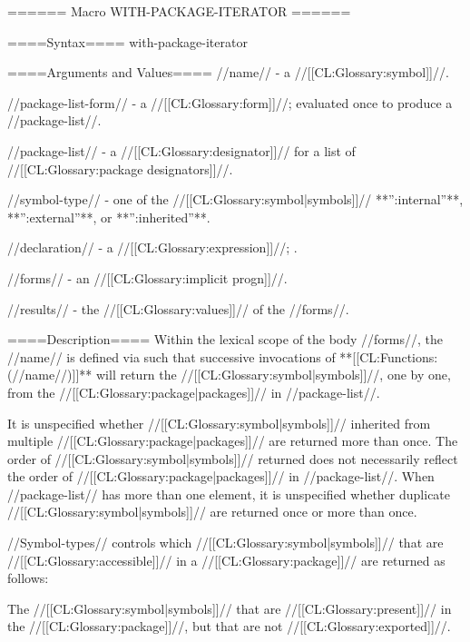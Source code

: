 ====== Macro WITH-PACKAGE-ITERATOR ======

====Syntax====
\DefmacWithValuesNewline with-package-iterator {  } {}

====Arguments and Values====
//name// - a //[[CL:Glossary:symbol]]//.

//package-list-form// - a //[[CL:Glossary:form]]//; evaluated once to produce a //package-list//.

//package-list// - a //[[CL:Glossary:designator]]// for a list of //[[CL:Glossary:package designators]]//.

//symbol-type// - one of the //[[CL:Glossary:symbol|symbols]]// **'':internal''**, **'':external''**, or **'':inherited''**.

//declaration// - a  //[[CL:Glossary:expression]]//; \noeval.

//forms// - an //[[CL:Glossary:implicit progn]]//.

//results// - the //[[CL:Glossary:values]]// of the //forms//.

====Description====
Within the lexical scope of the body //forms//, the //name// is defined via  such that successive invocations of **[[CL:Functions:(//name//)]]** will return the //[[CL:Glossary:symbol|symbols]]//, one by one, from the //[[CL:Glossary:package|packages]]// in //package-list//.

It is unspecified whether //[[CL:Glossary:symbol|symbols]]// inherited from multiple //[[CL:Glossary:package|packages]]// are returned more than once. The order of //[[CL:Glossary:symbol|symbols]]// returned does not necessarily reflect the order of //[[CL:Glossary:package|packages]]// in //package-list//. When //package-list// has more than one element, it is unspecified whether duplicate //[[CL:Glossary:symbol|symbols]]// are returned once or more than once.

//Symbol-types// controls which //[[CL:Glossary:symbol|symbols]]// that are //[[CL:Glossary:accessible]]// in a //[[CL:Glossary:package]]// are returned as follows:

\beginlist {}

The //[[CL:Glossary:symbol|symbols]]// that are //[[CL:Glossary:present]]// in the //[[CL:Glossary:package]]//, but that are not //[[CL:Glossary:exported]]//.


